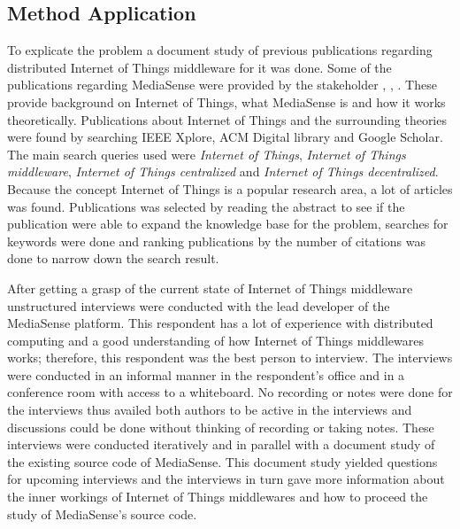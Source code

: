 %

\subsection{Method Application}
To explicate the problem a document study of previous publications regarding distributed Internet of Things middleware for it was done. Some of the publications regarding MediaSense were provided by the stakeholder \cite{TheMediaSenseFramework}, \cite{Kanter539187}, \cite{Walters413794}. These provide background on Internet of Things, what MediaSense is and how it works theoretically. Publications about Internet of Things and the surrounding theories were found by searching IEEE Xplore, ACM Digital library and Google Scholar. The main search queries used were \emph{Internet of Things}, \emph{Internet of Things middleware}, \emph{Internet of Things centralized} and \emph{Internet of Things decentralized}. Because the concept Internet of Things is a popular research area, a lot of articles was found. Publications was selected by reading the abstract to see if the publication were able to expand the knowledge base for the problem, searches for keywords were done and ranking publications by the number of citations was done to narrow down the search result. 

After getting a grasp of the current state of Internet of Things middleware unstructured interviews were conducted with the lead developer of the MediaSense platform. This respondent has a lot of experience with distributed computing and a good understanding of how Internet of Things middlewares works; therefore, this respondent was the best person to interview. The interviews were conducted in an informal manner in the respondent's office and in a conference room with access to a whiteboard. No recording or notes were done for the interviews thus availed both authors to be active in the interviews and discussions could be done without thinking of recording or taking notes. These interviews were conducted iteratively and in parallel with a document study of the existing source code of MediaSense. This document study yielded questions for upcoming interviews and the interviews in turn gave more information about the inner workings of Internet of Things middlewares and how to proceed the study of MediaSense's source code.

